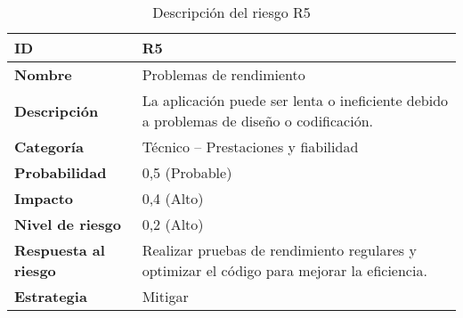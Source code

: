 \begin{table}[H]
	\centering
	\begin{tabular}{|l|m{12cm}|}
		\hline
		\textbf{ID}                  & R5                                                                                          \\
		\hline
		\textbf{Nombre}              & Problemas de rendimiento                                                                    \\
		\hline
		\textbf{Descripción}         & La aplicación puede ser lenta o ineficiente debido a problemas de diseño o codificación.    \\
		\hline
		\textbf{Categoría}           & Técnico – Prestaciones y fiabilidad                                                         \\
		\hline
		\textbf{Probabilidad}        & 0,5 (Probable)                                                                              \\
		\hline
		\textbf{Impacto}             & 0,4 (Alto)                                                                                  \\
		\hline
		\textbf{Nivel de riesgo}     & 0,2 (Alto)                                                                                  \\
		\hline
		\textbf{Respuesta al riesgo} & Realizar pruebas de rendimiento regulares y optimizar el código para mejorar la eficiencia. \\
		\hline
		\textbf{Estrategia}          & Mitigar                                                                                     \\
		\hline
	\end{tabular}
	\caption{Descripción del riesgo R5}
\end{table}

\vspace{0.5cm}

